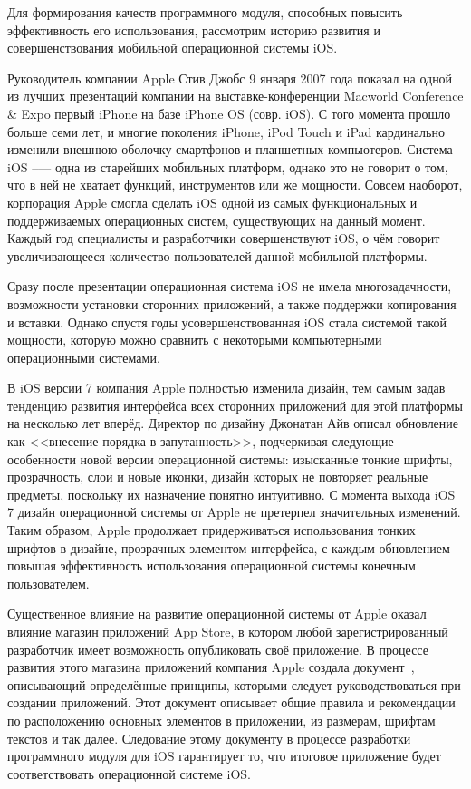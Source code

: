 Для формирования качеств программного модуля, способных повысить эффективность его
использования, рассмотрим историю развития и совершенствования мобильной
операционной системы iOS.

Руководитель компании Apple Стив Джобс 9 января 2007 года показал на одной
из лучших презентаций компании на выставке-конференции
Macworld Conference \& Expo первый iPhone на базе iPhone OS (совр. iOS).
С того момента прошло больше семи лет, и многие поколения iPhone, iPod Touch и iPad
кардинально изменили внешнюю оболочку смартфонов и планшетных компьютеров.
Система iOS --— одна из старейших мобильных платформ, однако это не говорит о том,
что в ней не хватает функций, инструментов или же мощности.
Совсем наоборот, корпорация Apple смогла сделать iOS одной из самых функциональных
и поддерживаемых операционных систем, существующих на данный момент.
Каждый год специалисты и разработчики совершенствуют iOS,
о чём говорит увеличивающееся количество пользователей данной мобильной платформы.

Сразу после презентации операционная система iOS не имела многозадачности,
возможности установки сторонних приложений, а также поддержки копирования и вставки.
Однако спустя годы усовершенствованная iOS стала системой такой мощности,
которую можно сравнить с некоторыми компьютерными операционными системами.

В iOS версии 7 компания Apple полностью изменила дизайн,
тем самым задав тенденцию развития интерфейса всех сторонних приложений для этой
платформы на несколько лет вперёд. Директор по дизайну Джонатан Айв описал
обновление как <<внесение порядка в запутанность>>, подчеркивая следующие
особенности новой версии операционной системы: изысканные тонкие шрифты,
прозрачность, слои и новые иконки, дизайн которых не повторяет реальные предметы,
поскольку их назначение понятно интуитивно.
С момента выхода iOS 7 дизайн операционной системы от Apple не претерпел
значительных изменений. Таким образом, Apple продолжает придерживаться
использования тонких шрифтов в дизайне, прозрачных элементом интерфейса,
с каждым обновлением повышая эффективность использования операционной
системы конечным пользователем.

Существенное влияние на развитие операционной
системы от Apple оказал влияние магазин приложений App Store, в котором
любой зарегистрированный разработчик имеет возможность опубликовать своё
приложение. В процессе развития этого магазина приложений компания Apple
создала документ~\cite{ios_hig}, описывающий определённые принципы, которыми следует
руководствоваться при создании приложений. Этот документ описывает общие
правила и рекомендации по расположению основных элементов в приложении,
из размерам, шрифтам текстов и так далее.
Следование этому документу в процессе разработки программного модуля для iOS
гарантирует то, что итоговое приложение будет соответствовать
операционной системе iOS.

